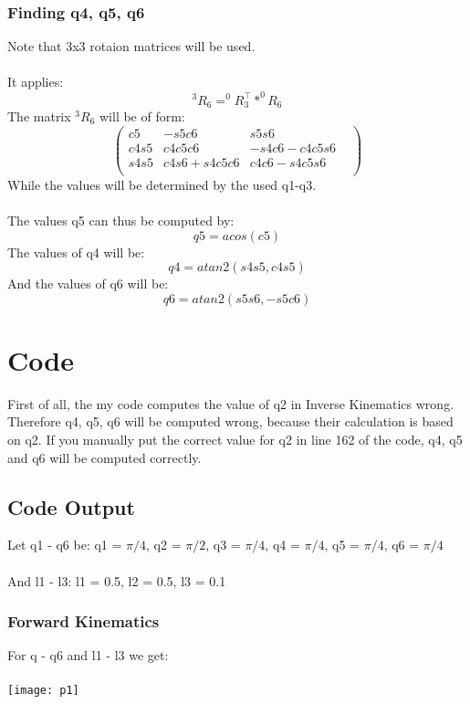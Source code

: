\documentclass{article}
\begin{document}
	\subsubsection{Finding q4, q5, q6}
	Note that 3x3 rotaion matrices will be used.\\\\
	It applies:
	\begin{equation}
	^{3}R_{6} = ^{0}R^{\top}_{3} * ^{0}R_{6}
	\end{equation}
	The matrix $^{3}R_{6}$ will be of form:
	$$
	\begin{pmatrix}
	c5&-s5c6&s5s6\\
	c4s5&c4c5c6&-s4c6-c4c5s6&\\
	s4s5&c4s6+s4c5c6&c4c6-s4c5s6&\\
	\end{pmatrix}
	$$
	While the values will be determined by the used q1-q3.\\
	\\The values q5 can thus be computed by:
	\begin{equation}
	q5 = acos(c5)
	\end{equation}
	The values of q4 will be: 
	\begin{equation}
	q4 = atan2(s4s5, c4s5)
	\end{equation}
	And the values of q6 will be:
	\begin{equation}
	q6 = atan2(s5s6, -s5c6)
	\end{equation}
	\newpage
	\section{Code}
	First of all, the my code computes the value of q2 in Inverse Kinematics wrong. Therefore q4, q5, q6 will be computed wrong, because their calculation is based on q2. If you manually put the correct value for q2 in line 162 of the code, q4, q5 and q6 will be computed correctly. 
	\subsection{Code Output}
	Let q1 - q6 be: q1 = ${\pi/4}$, q2 = ${\pi/2}$, q3 = ${\pi/4}$, q4 = ${\pi/4}$, q5 = ${\pi/4}$, q6 = ${\pi/4}$\\\\ And l1 - l3:  l1 = 0.5, l2 = 0.5, l3 = 0.1
	\subsubsection{Forward Kinematics}
	For q - q6 and l1 - l3 we get: \\
	\\
	\texttt{[image: p1]}
\end{document}
